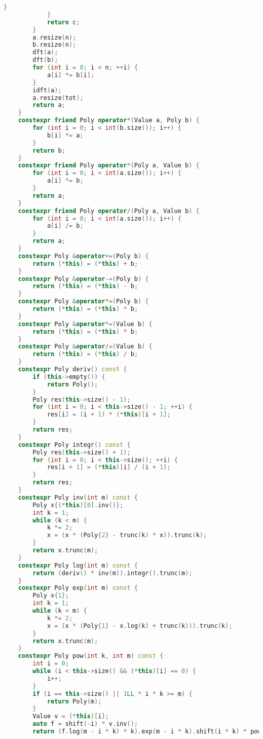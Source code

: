 \begin{lstlisting}[language=c++]
                }
            }
            return c;
        }
        a.resize(n);
        b.resize(n);
        dft(a);
        dft(b);
        for (int i = 0; i < n; ++i) {
            a[i] *= b[i];
        }
        idft(a);
        a.resize(tot);
        return a;
    }
    constexpr friend Poly operator*(Value a, Poly b) {
        for (int i = 0; i < int(b.size()); i++) {
            b[i] *= a;
        }
        return b;
    }
    constexpr friend Poly operator*(Poly a, Value b) {
        for (int i = 0; i < int(a.size()); i++) {
            a[i] *= b;
        }
        return a;
    }
    constexpr friend Poly operator/(Poly a, Value b) {
        for (int i = 0; i < int(a.size()); i++) {
            a[i] /= b;
        }
        return a;
    }
    constexpr Poly &operator+=(Poly b) {
        return (*this) = (*this) + b;
    }
    constexpr Poly &operator-=(Poly b) {
        return (*this) = (*this) - b;
    }
    constexpr Poly &operator*=(Poly b) {
        return (*this) = (*this) * b;
    }
    constexpr Poly &operator*=(Value b) {
        return (*this) = (*this) * b;
    }
    constexpr Poly &operator/=(Value b) {
        return (*this) = (*this) / b;
    }
    constexpr Poly deriv() const {
        if (this->empty()) {
            return Poly();
        }
        Poly res(this->size() - 1);
        for (int i = 0; i < this->size() - 1; ++i) {
            res[i] = (i + 1) * (*this)[i + 1];
        }
        return res;
    }
    constexpr Poly integr() const {
        Poly res(this->size() + 1);
        for (int i = 0; i < this->size(); ++i) {
            res[i + 1] = (*this)[i] / (i + 1);
        }
        return res;
    }
    constexpr Poly inv(int m) const {
        Poly x{(*this)[0].inv()};
        int k = 1;
        while (k < m) {
            k *= 2;
            x = (x * (Poly{2} - trunc(k) * x)).trunc(k);
        }
        return x.trunc(m);
    }
    constexpr Poly log(int m) const {
        return (deriv() * inv(m)).integr().trunc(m);
    }
    constexpr Poly exp(int m) const {
        Poly x{1};
        int k = 1;
        while (k < m) {
            k *= 2;
            x = (x * (Poly{1} - x.log(k) + trunc(k))).trunc(k);
        }
        return x.trunc(m);
    }
    constexpr Poly pow(int k, int m) const {
        int i = 0;
        while (i < this->size() && (*this)[i] == 0) {
            i++;
        }
        if (i == this->size() || 1LL * i * k >= m) {
            return Poly(m);
        }
        Value v = (*this)[i];
        auto f = shift(-i) * v.inv();
        return (f.log(m - i * k) * k).exp(m - i * k).shift(i * k) * power(v, k);

\end{lstlisting}
